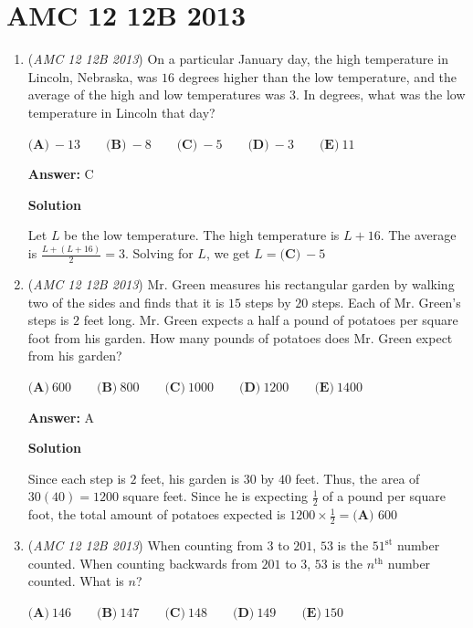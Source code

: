 \section{AMC 12 12B 2013}
        \begin{enumerate}
        	\item (\textit{AMC 12 12B 2013}) On a particular January day, the high temperature in Lincoln, Nebraska, was $16$ degrees higher than the low temperature, and the average of the high and low temperatures was $3$. In degrees, what was the low temperature in Lincoln that day?


 $\textbf{(A)}\ -13 \qquad \textbf{(B)}\ -8 \qquad \textbf{(C)}\ -5 \qquad \textbf{(D)}\ -3 \qquad \textbf{(E)}\ 11$

 \textbf{Answer: }C



\textbf{Solution}

Let $L$ be the low temperature. The high temperature is $L+16$. The average is $\frac{L+(L+16)}{2}=3$. Solving for $L$, we get $L=\boxed{\textbf{(C)} \  -5}$



	\item (\textit{AMC 12 12B 2013}) Mr. Green measures his rectangular garden by walking two of the sides and finds that it is $15$ steps by $20$ steps. Each of Mr. Green’s steps is $2$ feet long. Mr. Green expects a half a pound of potatoes per square foot from his garden. How many pounds of potatoes does Mr. Green expect from his garden?


 $\textbf{(A)}\ 600 \qquad \textbf{(B)}\ 800 \qquad \textbf{(C)}\ 1000 \qquad \textbf{(D)}\ 1200 \qquad \textbf{(E)}\ 1400$

 \textbf{Answer: }A



\textbf{Solution}

Since each step is $2$ feet, his garden is $30$ by $40$ feet.  Thus, the area of $30(40) = 1200$ square feet.  Since he is expecting $\frac{1}{2}$ of a pound per square foot, the total amount of potatoes expected is $1200 \times \frac{1}{2} =  \boxed{\textbf{(A) }600}$



	\item (\textit{AMC 12 12B 2013}) When counting from $3$ to $201$, $53$ is the $51^{\text{st}}$ number counted. When counting backwards from $201$ to $3$, $53$ is the $n^{\text{th}}$ number counted. What is $n$?


 $\textbf{(A)}\ 146 \qquad \textbf{(B)}\ 147 \qquad \textbf{(C)}\ 148 \qquad \textbf{(D)}\ 149 \qquad \textbf{(E)}\ 150$


\end{enumerate}
